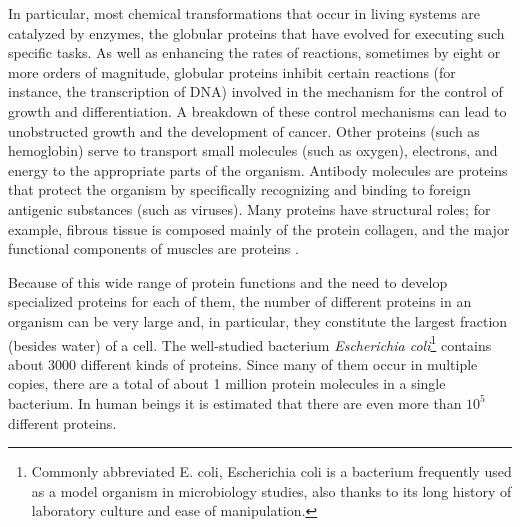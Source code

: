 In particular, most chemical transformations that occur in living systems are catalyzed by enzymes, the globular proteins that have evolved for executing such specific tasks. 
As well as enhancing the rates of reactions, sometimes by eight or more orders of magnitude, globular proteins inhibit certain reactions (for instance, the transcription of DNA) involved in the mechanism for the control of growth and differentiation. A breakdown of these control mechanisms can lead to unobstructed growth and the development of cancer. 
Other proteins (such as hemoglobin) serve to transport small molecules (such as oxygen), electrons, and energy to the appropriate parts of the organism. 
Antibody molecules are proteins that protect the organism by specifically recognizing and binding to foreign antigenic substances (such as viruses). 
Many proteins have structural roles; for example, fibrous tissue is composed mainly of the protein collagen, and the major functional components of muscles are proteins
\cite{brooks1988proteins}.

Because of this wide range of protein functions and the need to develop specialized proteins for each of them, the number of different proteins in an organism can be very large and, in particular, they constitute the largest fraction (besides water) of a cell. The well-studied bacterium \textit{Escherichia coli}\footnote{Commonly abbreviated E. coli, Escherichia coli is a bacterium frequently used as a model organism in microbiology studies, also thanks to its long history of laboratory culture and ease of manipulation.} contains about 3000 different kinds of proteins. Since many of them occur in multiple copies, there are a total of about 1 million protein molecules in a single bacterium. In human beings it is estimated that there are even more than $10^5$ different proteins.

